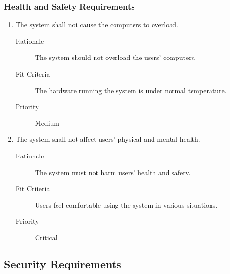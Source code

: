 \documentclass{article}
\begin{document}
\subsubsection{Health and Safety Requirements}

\begin{enumerate}[HS1]
\item The system shall not cause the computers to overload. \label{HS1}
	\begin{description}
  \item[Rationale] The system should not overload the users' computers.
	\item[Fit Criteria] The hardware running the system is under normal temperature.
	\item[Priority] Medium
  \end{description}
\item The system shall not affect users' physical and mental health. \label{HS2}
  \begin{description}
  \item[Rationale] The system must not harm users' health and safety.
  \item[Fit Criteria] Users feel comfortable using the system in various
    situations.
  \item[Priority] Critical
  \end{description}
\end{enumerate}

\subsection{Security Requirements}
\end{document}
